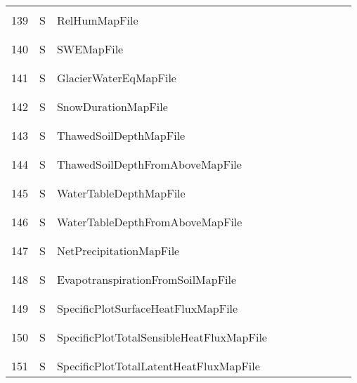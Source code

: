 \begin{longtable}{|c|c|l|c|c|c|c|p{}|c|p{}|}
&&&&&&&&&\\
139 & S & RelHumMapFile & & & & & & & \\
&&&&&&&&&\\\hline%
&&&&&&&&&\\
140 & S & SWEMapFile & & & & & & & \\
&&&&&&&&&\\\hline%
&&&&&&&&&\\
141 & S & GlacierWaterEqMapFile & & & & & & & \\
&&&&&&&&&\\\hline%
&&&&&&&&&\\
142 & S & SnowDurationMapFile & & & & & & & \\
&&&&&&&&&\\\hline%
&&&&&&&&&\\
143 & S & ThawedSoilDepthMapFile & & & & & & & \\
&&&&&&&&&\\\hline%
&&&&&&&&&\\
144 & S & ThawedSoilDepthFromAboveMapFile & & & & & & & \\
&&&&&&&&&\\\hline%
&&&&&&&&&\\
145 & S & WaterTableDepthMapFile & & & & & & & \\
&&&&&&&&&\\\hline%
&&&&&&&&&\\
146 & S & WaterTableDepthFromAboveMapFile & & & & & & & \\
&&&&&&&&&\\\hline%
&&&&&&&&&\\
147 & S & NetPrecipitationMapFile & & & & & & & \\
&&&&&&&&&\\\hline%
&&&&&&&&&\\
148 & S & EvapotranspirationFromSoilMapFile & & & & & & & \\
&&&&&&&&&\\\hline%
&&&&&&&&&\\
149 & S & SpecificPlotSurfaceHeatFluxMapFile & & & & & & & \\
&&&&&&&&&\\\hline%
&&&&&&&&&\\
150 & S & SpecificPlotTotalSensibleHeatFluxMapFile & & & & & & & \\
&&&&&&&&&\\\hline%
&&&&&&&&&\\
151 & S & SpecificPlotTotalLatentHeatFluxMapFile & & & & & & & \\

\end{longtable}
